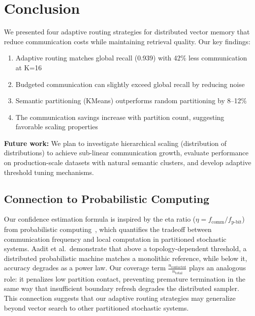 \documentclass[10pt,twocolumn]{article}
\begin{document}
\section{Conclusion}

We presented four adaptive routing strategies for distributed vector memory that reduce communication costs while maintaining retrieval quality. Our key findings:

\begin{enumerate}
    \item Adaptive routing matches global recall (0.939) with 42\% less communication at K=16
    \item Budgeted communication can slightly exceed global recall by reducing noise
    \item Semantic partitioning (KMeans) outperforms random partitioning by 8--12\%
    \item The communication savings increase with partition count, suggesting favorable scaling properties
\end{enumerate}

\textbf{Future work:} We plan to investigate hierarchical scaling (distribution of distributions) to achieve sub-linear communication growth, evaluate performance on production-scale datasets with natural semantic clusters, and develop adaptive threshold tuning mechanisms.

\subsection{Connection to Probabilistic Computing}

Our confidence estimation formula is inspired by the eta ratio ($\eta = f_{\text{comm}} / f_{\text{p-bit}}$) from probabilistic computing~\cite{aadit2026programmable}, which quantifies the tradeoff between communication frequency and local computation in partitioned stochastic systems. Aadit et al.~demonstrate that above a topology-dependent threshold, a distributed probabilistic machine matches a monolithic reference, while below it, accuracy degrades as a power law. Our coverage term $\frac{n_{\text{contacted}}}{n_{\text{total}}}$ plays an analogous role: it penalizes low partition contact, preventing premature termination in the same way that insufficient boundary refresh degrades the distributed sampler. This connection suggests that our adaptive routing strategies may generalize beyond vector search to other partitioned stochastic systems.


\end{document}
